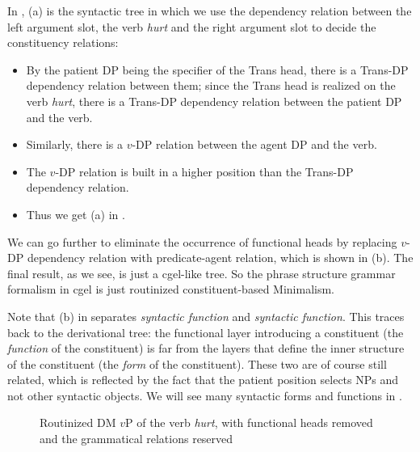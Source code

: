 \documentclass[../main.tex]{subfiles}
\begin{document}
In , (a) is the syntactic tree in which 
we use the dependency relation between the left argument slot, the verb \emph{hurt} and the right 
argument slot to decide the constituency relations:
\begin{itemize}
    \item By the patient DP being the specifier of the Trans head, there is a Trans-DP dependency relation between them; since the Trans head is realized on the verb \emph{hurt}, there is a Trans-DP dependency relation between the patient DP and the verb. %
    \item Similarly, there is a $v$-DP relation between the agent DP and the verb.
    \item The $v$-DP relation is built in a higher position than the Trans-DP dependency relation.
    \item Thus we get (a) in .
\end{itemize}
We can go further to eliminate the occurrence of functional heads by replacing $v$-DP dependency relation 
with predicate-agent relation, which is shown in (b). The final result, as we see, is just a \ac{cgel}-like 
tree. So the phrase structure grammar formalism in \ac{cgel} is just routinized constituent-based Minimalism.

Note that (b) in  separates \emph{syntactic function} and \emph{syntactic function}.
This traces back to the derivational tree: 
the functional layer introducing a constituent (the \emph{function} of the constituent) is far 
from the layers that define the inner structure of the constituent (the \emph{form} of the constituent).
These two are of course still related, which is reflected by the fact that 
the patient position selects NPs and not other syntactic objects.
We will see many syntactic forms and functions in .

\begin{figure}
    \centering
    

    \caption{Routinized DM $v$P of the verb \emph{hurt}, with functional heads removed and the grammatical relations reserved}
    \label{fig:hurt-constituent-tree}
\end{figure}
\end{document}
